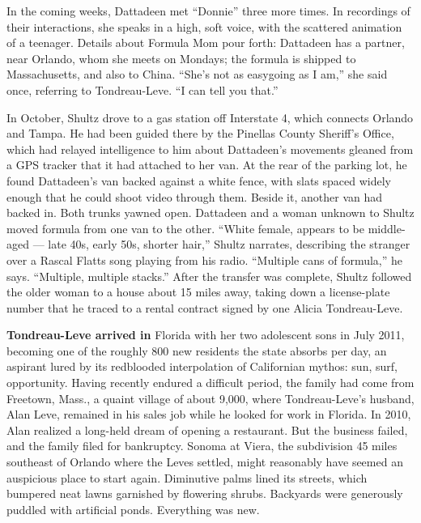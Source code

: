 In the coming weeks, Dattadeen met ``Donnie'' three more times. In
recordings of their interactions, she speaks in a high, soft voice, with
the scattered animation of a teenager. Details about Formula Mom pour
forth: Dattadeen has a partner, near Orlando, whom she meets on Mondays;
the formula is shipped to Massachusetts, and also to China. ``She's not
as easygoing as I am,'' she said once, referring to Tondreau-Leve. ``I
can tell you that.''

In October, Shultz drove to a gas station off Interstate 4, which
connects Orlando and Tampa. He had been guided there by the Pinellas
County Sheriff's Office, which had relayed intelligence to him about
Dattadeen's movements gleaned from a GPS tracker that it had attached to
her van. At the rear of the parking lot, he found Dattadeen's van backed
against a white fence, with slats spaced widely enough that he could
shoot video through them. Beside it, another van had backed in. Both
trunks yawned open. Dattadeen and a woman unknown to Shultz moved
formula from one van to the other. ``White female, appears to be
middle-aged --- late 40s, early 50s, shorter hair,'' Shultz narrates,
describing the stranger over a Rascal Flatts song playing from his
radio. ``Multiple cans of formula,'' he says. ``Multiple, multiple
stacks.'' After the transfer was complete, Shultz followed the older
woman to a house about 15 miles away, taking down a license-plate number
that he traced to a rental contract signed by one Alicia Tondreau-Leve.

\textbf{Tondreau-Leve arrived in} Florida with her two adolescent sons
in July 2011, becoming one of the roughly 800 new residents the state
absorbs per day, an aspirant lured by its redblooded interpolation of
Californian mythos: sun, surf, opportunity. Having recently endured a
difficult period, the family had come from Freetown, Mass., a quaint
village of about 9,000, where Tondreau-Leve's husband, Alan Leve,
remained in his sales job while he looked for work in Florida. In 2010,
Alan realized a long-held dream of opening a restaurant. But the
business failed, and the family filed for bankruptcy. Sonoma at Viera,
the subdivision 45 miles southeast of Orlando where the Leves settled,
might reasonably have seemed an auspicious place to start again.
Diminutive palms lined its streets, which bumpered neat lawns garnished
by flowering shrubs. Backyards were generously puddled with artificial
ponds. Everything was new.

